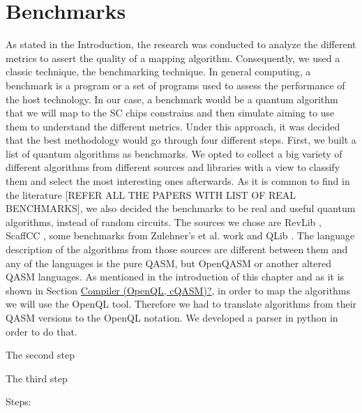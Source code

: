 \section*{Benchmarks}
\label{sec:orgd69db98}
As stated in the Introduction, the research was conducted to analyze the different metrics to assert the quality of a mapping algorithm.
Consequently, we used a classic technique, the benchmarking technique.
In general computing, a benchmark is a program or a set of programs used to assess the performance of the host technology.
In our case, a benchmark would be a quantum algorithm that we will map to the SC chips constrains and then simulate aiming to use them to understand the different metrics.
Under this approach, it was decided that the best methodology would go through four different steps.
First, we built a list of quantum algorithms as benchmarks.
We opted to collect a big variety of different algorithms from different sources and libraries with a view to classify them and select the most interesting ones afterwards.
As it is common to find in the literature [REFER ALL THE PAPERS WITH LIST OF REAL BENCHMARKS], we also decided the benchmarks to be real and useful quantum algorithms, instead of random circuits.
The sources we chose are RevLib \cite{Wille_2008}, ScaffCC \cite{JavadiAbhari_2015}, some benchmarks from Zulehner's et al. work \cite{zulehner17:effic_method_mappin_quant_circuit} and QLib \cite{Lin_2014}.
The language description of the algorithms from those sources are different between them and any of the languages is the pure QASM, but OpenQASM or another altered QASM languages.
As mentioned in the introduction of this chapter and as it is shown in Section \hyperref[sec:orge263492]{Compiler (OpenQL, cQASM)?}, in order to map the algorithms we will use the OpenQL tool.
Therefore we had to translate algorithms from their QASM versions to the OpenQL notation.
We developed a parser in python in order to do that.

The second step

The third step 


Steps:


